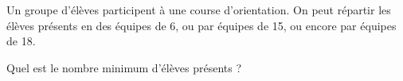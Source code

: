 \documentclass[main.tex]{subfiles}
\begin{document}
   \begin{exercise}  \hfill 
   	
\noindent Un groupe d'élèves participent à une course d'orientation. On peut répartir les élèves présents en des équipes de 6, ou par équipes de 15, ou encore par équipes de 18.
   	
 Quel est le nombre minimum d'élèves présents ?
   \end{exercise}  
%	 
\cleardoublepage
\end{document}
